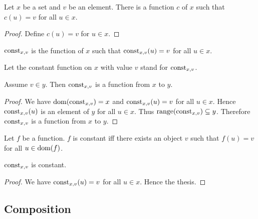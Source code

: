\documentclass[../../sets-and-functions.ftl.tex]{subfiles}
\begin{document}
  \begin{forthel}
    \begin{lemma}
      Let $x$ be a set and $v$ be an element.
      There is a function $c$ of $x$ such that $c(u) = v$ for all $u \in x$.
    \end{lemma}
    \begin{proof}
      Define $c(u) = v$ for $u \in x$.
    \end{proof}

    \begin{definition}
      $\mbox{const}_{x,v}$ is the function of $x$ such that $\mbox{const}_{x,v}(u) = v$ for all $u \in x$.
    \end{definition}

    Let the constant function on $x$ with value $v$ stand for $\mbox{const}_{x,v}$.

    \begin{proposition}[SF 02 01 180417]
      Assume $v \in y$.
      Then $\mbox{const}_{x,v}$ is a function from $x$ to $y$.
    \end{proposition}
    \begin{proof}
      We have $\operatorname{dom}(\mbox{const}_{x,v}) = x$ and $\mbox{const}_{x,v}(u) = v$ for all $u \in x$.
      Hence $\mbox{const}_{x,v}(u)$ is an element of $y$ for all $u \in x$.
      Thus $\operatorname{range}(\mbox{const}_{x,v}) \subseteq y$.
      Therefore $\mbox{const}_{x,v}$ is a function from $x$ to $y$.
    \end{proof}

    \begin{definition}
      Let $f$ be a function.
      $f$ is constant iff there exists an object $v$ such that $f(u) = v$ for all $u \in \operatorname{dom}(f)$.
    \end{definition}

    \begin{proposition}[SF 02 01 359618]
      $\mbox{const}_{x,v}$ is constant.
    \end{proposition}
    \begin{proof}
      We have $\mbox{const}_{x,v}(u) = v$ for all $u \in x$.
      Hence the thesis.
    \end{proof}
  \end{forthel}


  \subsection{Composition}
\end{document}
